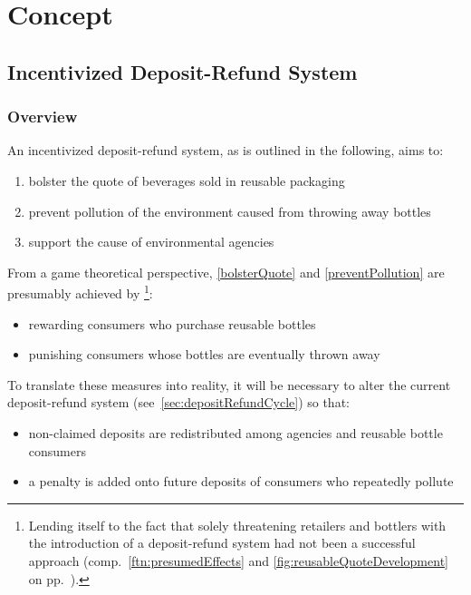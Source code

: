 
\chapter{Concept}
\label{chp:concept}

\section{Incentivized Deposit-Refund System}
\label{sec:incentivizedSystem}

\subsection{Overview}
\label{sec:incentivizedOverview}
An incentivized deposit-refund system, as is outlined in the following, aims to:

\begin{enumerate}[label=(\Alph*)]
  \item \label{bolsterQuote} bolster the quote of beverages sold in reusable packaging
  \item \label{preventPollution} prevent pollution of the environment caused from throwing away bottles
  \item support the cause of environmental agencies
\end{enumerate}

From a game theoretical perspective, \ref{bolsterQuote} and \ref{preventPollution} are presumably achieved by \footnote{Lending itself to the fact that solely threatening retailers and bottlers with the introduction of a deposit-refund system had not been a successful approach (comp.~\autoref{ftn:presumedEffects} and \autoref{fig:reusableQuoteDevelopment} on pp.~).}:

\begin{itemize}
  \item rewarding consumers who purchase reusable bottles
  \item punishing consumers whose bottles are eventually thrown away
\end{itemize}

To translate these measures into reality, it will be necessary to alter the current deposit-refund system (see~\ref{sec:depositRefundCycle}) so that:

\begin{itemize}
  \item non-claimed deposits are redistributed among agencies and reusable bottle consumers
  \item a penalty is added onto future deposits of consumers who repeatedly pollute
\end{itemize}

